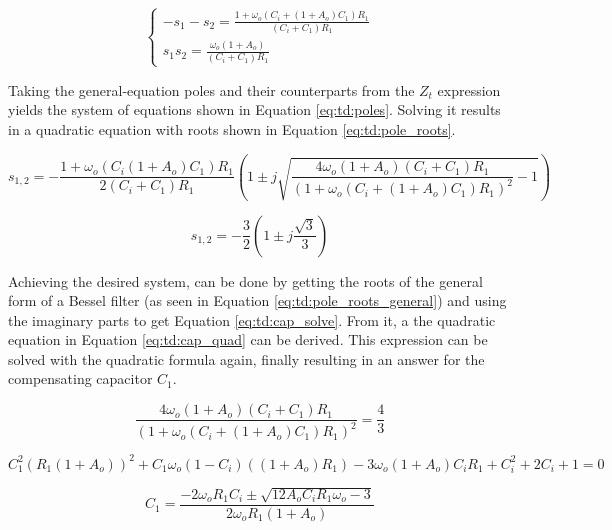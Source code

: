 \begin{equation}\label{eq:td:poles}
	\begin{cases}
		-s_1 - s_2 = \frac{1 + \omega_o(C_i + (1 + A_o)C_1)R_1}{(C_i + C_1)R_1} \\
		s_1s_2 = \frac{\omega_o(1 + A_o)}{(C_i + C_1)R_1}
	\end{cases}
\end{equation}

Taking the general-equation poles and their counterparts from the $Z_t$ expression yields the system of equations shown in Equation \eqref{eq:td:poles}. Solving it results in a quadratic equation with roots shown in Equation \eqref{eq:td:pole_roots}.

\begin{equation}\label{eq:td:pole_roots}
	s_{1, 2} = -\frac{1 + \omega_o(C_i(1+A_o)C_1)R_1}{2(C_i + C_1)R_1}\left(1 \pm j\sqrt{\frac{4\omega_o(1 + A_o)(C_i + C_1)R_1}{(1 + \omega_o(C_i + (1 + A_o)C_1)R_1)^2} - 1}\right)
\end{equation}

\begin{equation}\label{eq:td:pole_roots_general}
	s_{1, 2} = -\frac{3}{2}(1 \pm j\frac{\sqrt{3}}{3})
\end{equation}

Achieving the desired system, can be done by getting the roots of the general form of a Bessel filter (as seen in Equation \eqref{eq:td:pole_roots_general}) and using the imaginary parts to get Equation \eqref{eq:td:cap_solve}. From it, a the quadratic equation in Equation \eqref{eq:td:cap_quad} can be derived. This expression can be solved with the quadratic formula again, finally resulting in an answer for the compensating capacitor $C_1$. 

\begin{equation}\label{eq:td:cap_solve}
	\frac{4\omega_o(1 + A_o)(C_i + C_1)R_1}{(1 + \omega_o(C_i + (1 + A_o)C_1)R_1)^2} = \frac{4}{3}
\end{equation}

\begin{equation}\label{eq:td:cap_quad}
	C_1^2(R_1(1 + A_o))^2 + C_1\omega_o(1 - C_i)((1 + A_o)R_1) - 3\omega_o(1 + A_o)C_iR_1 + C_i^2 + 2C_i + 1 = 0
\end{equation}

\begin{equation}\label{eq:td:cap_roots}
	C_1 = \frac{-2\omega_oR_1C_i \pm \sqrt{12A_oC_iR_1\omega_o - 3}}{2\omega_oR_1(1 + A_o)}
\end{equation}

